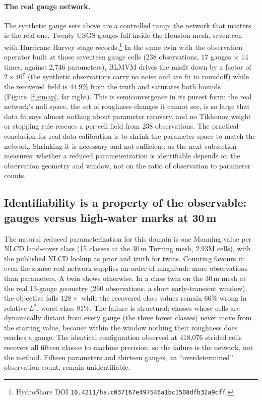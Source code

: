 \documentclass[11pt]{article}
\begin{document}
\paragraph{The real gauge network.}
The synthetic gauge sets above are a controlled ramp; the network that
matters is the real one. Twenty USGS gauges fall inside the Houston
mesh, seventeen with Hurricane Harvey stage
records.\footnote{HydroShare DOI
\texttt{10.4211/hs.c037167e497546a1bc1508dfb32a9cff}.}
In the same twin with the observation operator built at those
seventeen gauge cells (238 observations, 17 gauges $\times$ 14 times,
against 2{,}746 parameters), BLMVM drives the misfit down by a factor
of $2\times10^{7}$ (the synthetic observations carry no noise and are
fit to roundoff) while the recovered field is $44.9\%$ from the truth
and saturates both bounds (Figure~\ref{fig:map}, far right). This is
semiconvergence in its purest form: the real network's null space,
the set of roughness changes it cannot see, is so large that data fit
says almost nothing about parameter recovery,
and no Tikhonov weight or stopping rule rescues a per-cell field from
238 observations. The practical conclusion for real-data calibration
is to shrink the parameter space to match the network. Shrinking it
is necessary and not sufficient, as the next subsection measures:
whether a reduced parameterization is identifiable depends on the
observation geometry and window, not on the ratio of observation to
parameter counts.

\subsection{Identifiability is a property of the observable: gauges
versus high-water marks at 30\,m}
\label{sec:identifiability}

The natural reduced parameterization for this domain is one Manning
value per NLCD land-cover class (15 classes at the 30\,m Turning mesh,
2.93M cells), with the published NLCD lookup as prior and truth for
twins. Counting favours it: even the sparse real network supplies an
order of magnitude more observations than parameters. A twin shows
otherwise. In a class twin on the 30\,m mesh at the real
13-gauge geometry (260 observations, a short early-transient window),
the objective falls $128\times$ while the recovered class values
remain $66\%$ wrong in relative $L^2$, worst class $81\%$. The
failure is structural: classes whose cells are dynamically distant
from every gauge (the three forest classes) never move from the
starting value, because within the window nothing their roughness
does reaches a gauge. The identical configuration observed at
418{,}076 strided cells recovers all fifteen classes to machine
precision, so the failure is the network, not the method. Fifteen
parameters and thirteen gauges, an ``overdetermined'' observation
count, remain unidentifiable.
\end{document}
